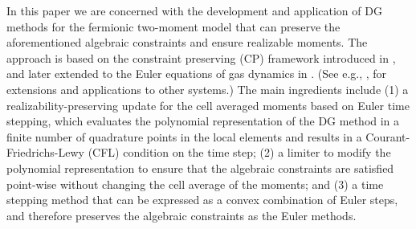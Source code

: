 In this paper we are concerned with the development and application of DG methods for the fermionic two-moment model that can preserve the aforementioned algebraic constraints and ensure realizable moments.  
The approach is based on the constraint preserving (CP) framework introduced in \cite{zhangShu_2010a}, and later extended to the Euler equations of gas dynamics in \cite{zhangShu_2010b}.  
(See e.g., \cite{endeve_etal_2015}, for extensions and applications to other systems.)  
The main ingredients include (1) a realizability-preserving update for the cell averaged moments based on Euler time stepping, which evaluates the polynomial representation of the DG method in a finite number of quadrature points in the local elements and results in a Courant-Friedrichs-Lewy (CFL) condition on the time step; (2) a limiter to modify the polynomial representation to ensure that the algebraic constraints are satisfied point-wise without changing the cell average of the moments; and (3) a time stepping method that can be expressed as a convex combination of Euler steps, and therefore preserves the algebraic constraints as the Euler methods.  

